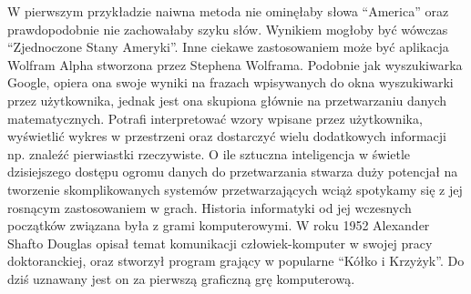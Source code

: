 \begin{par}
W pierwszym przykładzie naiwna metoda nie ominęłaby słowa ``America'' oraz prawdopodobnie nie zachowałaby szyku słów. Wynikiem mogłoby być wówczas ``Zjednoczone Stany Ameryki''.
Inne ciekawe zastosowaniem może być aplikacja Wolfram Alpha stworzona przez Stephena Wolframa.
Podobnie jak wyszukiwarka Google, opiera ona swoje wyniki na frazach wpisywanych do okna wyszukiwarki przez użytkownika, jednak jest ona skupiona głównie na przetwarzaniu danych matematycznych.
Potrafi interpretować wzory wpisane przez użytkownika, wyświetlić wykres w przestrzeni oraz dostarczyć wielu dodatkowych informacji np. znaleźć pierwiastki rzeczywiste.
O ile sztuczna inteligencja w świetle dzisiejszego dostępu ogromu danych do przetwarzania stwarza duży potencjał na tworzenie skomplikowanych systemów przetwarzających wciąż spotykamy
się z jej rosnącym zastosowaniem w grach.
Historia informatyki od jej wczesnych początków związana była z grami komputerowymi. 
W roku 1952 Alexander Shafto Douglas opisał temat komunikacji człowiek-komputer w swojej pracy doktoranckiej, oraz stworzył program grający w popularne ``Kółko i Krzyżyk''.
Do dziś uznawany jest on za pierwszą graficzną grę komputerową.
\end{par}

